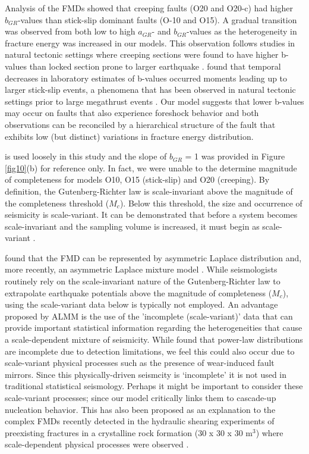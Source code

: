 \documentclass[preprint,1p, 10pt,authoryear]{elsarticle}
\begin{document}
Analysis of the FMDs showed that creeping faults (O20 and O20-c) had higher $b_{GR}$-values than stick-slip dominant faults  (O-10 and O15). A gradual transition was observed from both low to high $a_{GR}$- and $b_{GR}$-values as the heterogeneity in fracture energy was increased in our models. This observation follows studies in natural tectonic settings where creeping sections were found to have higher b-values than locked section prone to larger earthquake \citep{Amelung1997, Tormann2014}. \citet{Goebel2013} found that temporal decreases in laboratory estimates of b-values occurred moments leading up to larger stick-slip events, a phenomena that has been observed in natural tectonic settings prior to large megathrust events \citep{Tormann2015,Gulia2016,Gulia2019}. Our model suggests that lower b-values may occur on faults that also experience foreshock behavior and both observations can be reconciled by a hierarchical structure of the fault that exhibits low (but distinct) variations in fracture energy distribution.   

is used loosely in this study and the slope of $b_{GR}$ = 1 was provided in Figure \ref{fig10}(b) for reference only. In fact, we were unable to the determine magnitude of completeness for models O10, O15 (stick-slip) and O20 (creeping). By definition, the Gutenberg-Richter law is scale-invariant above the magnitude of the completeness threshold ($M_{c}$). Below this threshold, the size and occurrence of seismicity is scale-variant. It can be demonstrated that before a system becomes scale-invariant and the sampling volume is increased, it must begin as scale-variant \citep{Mignan2012}.

\citet{Mignan2012} found that the FMD can be represented by asymmetric Laplace distribution and, more recently, an asymmetric Laplace mixture model \citep[ALMM, ][]{Mignan2020}. While seismologists routinely rely on the scale-invariant nature of the Gutenberg-Richter law to extrapolate earthquake potentials above the magnitude of completeness ($M_{c}$), using the scale-variant data below is typically not employed. An advantage proposed by ALMM is the use of the 'incomplete (scale-variant)' data that can provide important statistical information regarding the heterogeneities that cause a scale-dependent mixture of seismicity. While \citet{Mignan2020} found that power-law distributions are incomplete due to detection limitations, we feel this could also occur due to scale-variant physical processes such as the presence of wear-induced fault mirrors. Since this physically-driven seismcity is `incomplete' it is not used in traditional statistical seismology. Perhaps it might be important to consider these scale-variant processes; since our model critically links them to cascade-up nucleation behavior. This has also been proposed as an explanation to the complex FMDs recently detected in the hydraulic shearing experiments of preexisting fractures in a crystalline rock formation (30 x 30 x 30 m$^{3}$) where scale-dependent physical processes were observed \citep{Villiger2019}.
\end{document}
